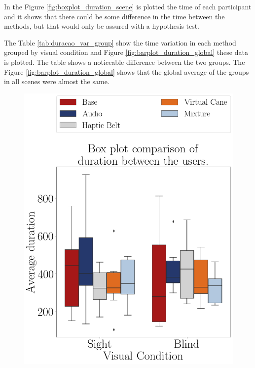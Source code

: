 In the Figure \ref{fig:boxplot_duration_scene} is plotted the time of each participant and it shows that there could be some difference in the time between the methods, but that would only be assured with a hypothesis test. 

%

The Table \ref{tab:duracao_var_group} show the time variation in each method grouped by visual condition and Figure \ref{fig:barplot_duration_global} these data is plotted. The table shows a noticeable difference between the two groups. The Figure \ref{fig:barplot_duration_global} shows that the global average of the groups in all scenes were almost the same.



\begin{figure}[!htb]
    \begin{minipage}{.45\linewidth}
        \centering
        \includegraphics[width = \linewidth]{Resultados/Tempo/Figuras/png/boxplot_time_scene.png}

\end{minipage}
\end{figure}
